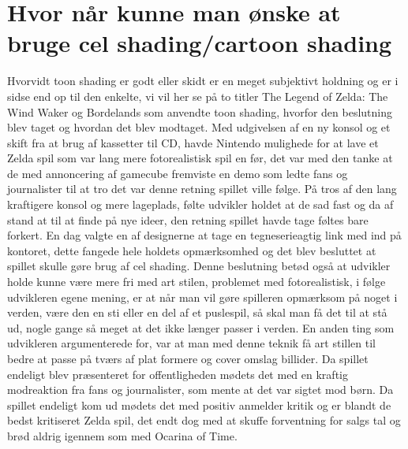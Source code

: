 \section{Hvor når kunne man ønske at bruge cel shading/cartoon shading}

Hvorvidt toon shading er godt eller skidt er en meget subjektivt holdning og er i sidse end op til den enkelte, vi vil her se på to titler The Legend of Zelda: The Wind Waker og Bordelands som anvendte toon shading, hvorfor den beslutning blev taget og hvordan det blev modtaget. Med udgivelsen af en ny konsol og et skift fra at brug af kassetter til CD, havde Nintendo mulighede for at lave et Zelda spil som var lang mere fotorealistisk spil en før, det var med den tanke at de med annoncering af gamecube fremviste en demo \cite{Zelda} som ledte fans og journalister til at tro det var denne retning spillet ville følge. På tros af den lang kraftigere konsol og mere lageplads, følte udvikler holdet at de sad fast og da af stand at til at finde på nye \cite{Zelda}
 ideer,  den retning spillet havde tage føltes bare forkert. En dag valgte en af designerne at tage en tegneserieagtig \cite{ToonLinkIsBorn}link med ind på kontoret, dette fangede hele holdets opmærksomhed og det blev besluttet at spillet skulle gøre brug af cel shading. Denne beslutning betød også at udvikler holde kunne være mere fri med art stilen, problemet med fotorealistisk, i følge udvikleren egene mening, er at når man vil gøre spilleren opmærksom på noget i verden, være den en sti eller en del af et puslespil, så skal man få det til at stå ud, nogle gange så meget at det ikke længer passer i verden. En anden ting som udvikleren argumenterede for, var at man med denne teknik få art stillen til bedre at passe på tværs af plat formere og cover omslag 
\cite{nintendo}billider. Da spillet endeligt blev præsenteret for offentligheden mødets det med en kraftig modreaktion fra fans og journalister, som mente at det var sigtet mod \cite{nintendo}børn. Da spillet endeligt kom ud mødets det med positiv \cite{BigScore}anmelder kritik og er blandt de bedst kritiseret Zelda spil, det endt dog med at skuffe forventning for salgs tal og brød aldrig igennem som med Ocarina of Time.